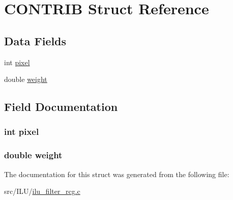 \hypertarget{struct_c_o_n_t_r_i_b}{\section{C\-O\-N\-T\-R\-I\-B Struct Reference}
\label{struct_c_o_n_t_r_i_b}
}
\subsection*{Data Fields}
\begin{DoxyCompactItemize}
\item 
int \hyperlink{struct_c_o_n_t_r_i_b_a10343bbbd2178606a4a93244b593e35a}{pixel}
\item 
double \hyperlink{struct_c_o_n_t_r_i_b_a99108733d00274978a4979dc072bd513}{weight}
\end{DoxyCompactItemize}


\subsection{Field Documentation}
\hypertarget{struct_c_o_n_t_r_i_b_a10343bbbd2178606a4a93244b593e35a}{
\subsubsection[{pixel}]{\setlength{\rightskip}{0pt plus 5cm}int pixel}}\label{struct_c_o_n_t_r_i_b_a10343bbbd2178606a4a93244b593e35a}
\hypertarget{struct_c_o_n_t_r_i_b_a99108733d00274978a4979dc072bd513}{
\subsubsection[{weight}]{\setlength{\rightskip}{0pt plus 5cm}double weight}}\label{struct_c_o_n_t_r_i_b_a99108733d00274978a4979dc072bd513}


The documentation for this struct was generated from the following file\-:\begin{DoxyCompactItemize}
\item 
src/\-I\-L\-U/\hyperlink{ilu__filter__rcg_8c}{ilu\-\_\-filter\-\_\-rcg.\-c}\end{DoxyCompactItemize}
